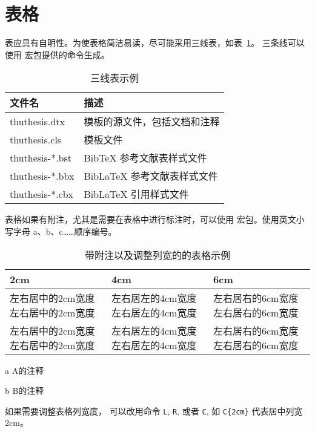 \section{表格}

表应具有自明性。为使表格简洁易读，尽可能采用三线表，如表~\ref{tab:three-line}。
三条线可以使用  宏包提供的命令生成。

\begin{table}
  \centering
  \caption{三线表示例}
  \begin{tabular}{ll}
    \toprule
    文件名          & 描述                         \\
    \midrule
    thuthesis.dtx   & 模板的源文件，包括文档和注释 \\
    thuthesis.cls   & 模板文件                     \\
    thuthesis-*.bst & BibTeX 参考文献表样式文件    \\
    thuthesis-*.bbx & BibLaTeX 参考文献表样式文件  \\
    thuthesis-*.cbx & BibLaTeX 引用样式文件        \\
    \bottomrule
  \end{tabular}
  \label{tab:three-line}
\end{table}

表格如果有附注，尤其是需要在表格中进行标注时，可以使用  宏包。使用英文小写字母 a、b、c……顺序编号。

\begin{table}
  \centering
  \begin{threeparttable}[c]
    \caption{带附注以及调整列宽的的表格示例}
    \label{tab:three-part-table}
  \begin{tabular}{C{2cm} L{4cm} R{6cm}}
    \toprule
    2cm          & 4cm & 6cm                         \\
    \midrule
    左右居中的2cm宽度左右居中的2cm宽度   & 左右居左的4cm宽度左右居左的4cm宽度 & 左右居右的6cm宽度左右居右的6cm宽度\\
    左右居中的2cm宽度左右居中的2cm宽度   & 左右居左的4cm宽度左右居左的4cm宽度 & 左右居右的6cm宽度左右居右的6cm宽度\\
    \bottomrule
  \end{tabular}
    \begin{tablenotes}
      \item [a] A的注释
      \item [b] B的注释
    \end{tablenotes}
  \end{threeparttable}
\end{table}
如果需要调整表格列宽度， 可以改用命令 \verb|L|, \verb|R|, 或者 \verb|C|, 如 \verb|C{2cm}| 代表居中列宽2cm。

